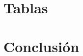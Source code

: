 \documentclass[a4paper]{article}
\begin{document}
    \lipsum[5-6]

    \section{Tablas}
    \lipsum[7]
    
    \lipsum[8]
    

    \section{Conclusión}
    \lipsum[9]
\end{document}
